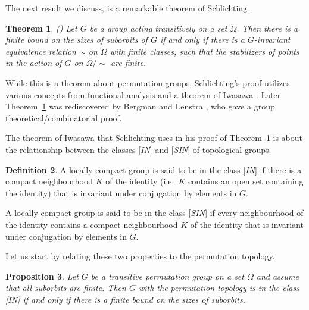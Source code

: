 \documentclass{emsprocart}
\newtheorem{theorem}{Theorem}[section]
\newtheorem{proposition}[theorem]{Proposition}
\theoremstyle{definition}
\newtheorem{definition}[theorem]{Definition}
\begin{document}
\bigskip

The next result we discuss, is a remarkable theorem of
Schlichting \cite{Schlichting1980}.

\begin{theorem}\label{TSchlichting}{\rm (\cite{Schlichting1980})}
Let $G$ be a group acting transitively on a set $\Omega$.  Then
there is a finite bound on the sizes of suborbits of $G$ if and only
if there is a $G$-invariant equivalence relation $\sim$ on $\Omega$ with finite
classes, such that the stabilizers of points in the action of $G$ on
$\Omega/\sim$ are finite.
\end{theorem}

While this is a theorem about
permutation groups, Schlichting's proof utilizes various concepts
from functional analysis and a theorem of Iwasawa
\cite[Theorem~1]{Iwasawa1951}.
Later Theorem~\ref{TSchlichting} was rediscovered by
Bergman and Lenstra \cite{BergmanLenstra1989}, who gave a group
theoretical/combinatorial proof.

The theorem of Iwasawa that Schlichting uses in his proof of 
Theorem~\ref{TSchlichting} is about the
relationship between the classes [{\em IN}] and   [{\em SIN}] of
    topological groups.

\begin{definition}
A locally compact group is said to be in the class [{\em IN}] if there is
  a compact neighbourhood $K$ of the identity (i.e.~$K$ contains an open
  set containing the identity) that is invariant under
  conjugation by elements in $G$.

A locally compact group is said to  be in the class [{\em SIN}] if every
  neighbourhood of the identity contains
  a compact neighbourhood $K$ of the identity that is invariant under
  conjugation by elements in $G$.
\end{definition}

Let us start by relating these two properties to the permutation
topology.

\begin{proposition}\label{PIN}
Let $G$ be a transitive permutation group on a set $\Omega$ and
assume that all suborbits are finite.  Then $G$ with the permutation
topology is in the class [{\em IN}] if and only if there is a finite bound
  on the sizes of suborbits.
\end{proposition}
\end{document}
